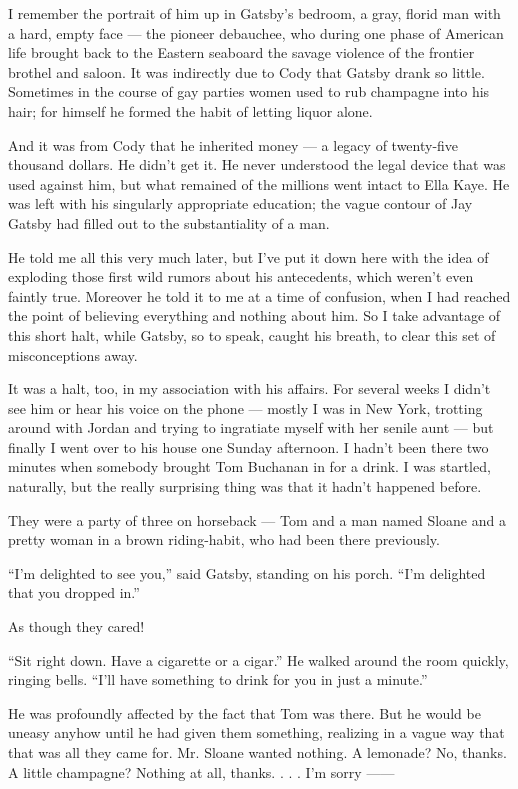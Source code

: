 \documentclass{znotebook}
\begin{document}
I remember the portrait of him up in Gatsby’s bedroom, a gray, florid man with a hard, empty face — the pioneer debauchee, who during one phase of American life brought back to the Eastern seaboard the savage violence of the frontier brothel and saloon. It was indirectly due to Cody that Gatsby drank so little. Sometimes in the course of gay parties women used to rub champagne into his hair; for himself he formed the habit of letting liquor alone.

And it was from Cody that he inherited money — a legacy of twenty-five thousand dollars. He didn’t get it. He never understood the legal device that was used against him, but what remained of the millions went intact to Ella Kaye. He was left with his singularly appropriate education; the vague contour of Jay Gatsby had filled out to the substantiality of a man.

He told me all this very much later, but I’ve put it down here with the idea of exploding those first wild rumors about his antecedents, which weren’t even faintly true. Moreover he told it to me at a time of confusion, when I had reached the point of believing everything and nothing about him. So I take advantage of this short halt, while Gatsby, so to speak, caught his breath, to clear this set of misconceptions away.

It was a halt, too, in my association with his affairs. For several weeks I didn’t see him or hear his voice on the phone — mostly I was in New York, trotting around with Jordan and trying to ingratiate myself with her senile aunt — but finally I went over to his house one Sunday afternoon. I hadn’t been there two minutes when somebody brought Tom Buchanan in for a drink. I was startled, naturally, but the really surprising thing was that it hadn’t happened before.

They were a party of three on horseback — Tom and a man named Sloane and a pretty woman in a brown riding-habit, who had been there previously.

``I’m delighted to see you,'' said Gatsby, standing on his porch. ``I’m delighted that you dropped in.''

As though they cared!

``Sit right down. Have a cigarette or a cigar.'' He walked around the room quickly, ringing bells. ``I’ll have something to drink for you in just a minute.''

He was profoundly affected by the fact that Tom was there. But he would be uneasy anyhow until he had given them something, realizing in a vague way that that was all they came for. Mr. Sloane wanted nothing. A lemonade? No, thanks. A little champagne? Nothing at all, thanks. . . . I’m sorry ——
\end{document}
